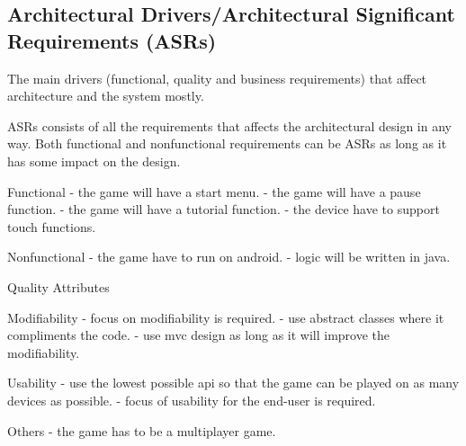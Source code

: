 \subsection{Architectural Drivers/Architectural Significant Requirements (ASRs)}
The main drivers (functional, quality and business requirements) that affect architecture and the system mostly.

ASRs consists of all the requirements that affects the architectural design in any way. Both functional and nonfunctional requirements can be ASRs as long as it has some impact on the design.

Functional
- the game will have a start menu.
- the game will have a pause function.
- the game will have a tutorial function.
- the device have to support touch functions.

Nonfunctional
- the game have to run on android.
- logic will be written in java.

Quality Attributes

Modifiability
- focus on modifiability is required.
- use abstract classes where it compliments the code.
- use mvc design as long as it will improve the modifiability.

Usability
- use the lowest possible api so that the game can be played on as many devices as possible.
- focus of usability for the end-user is required.

Others
- the game has to be a multiplayer game.

